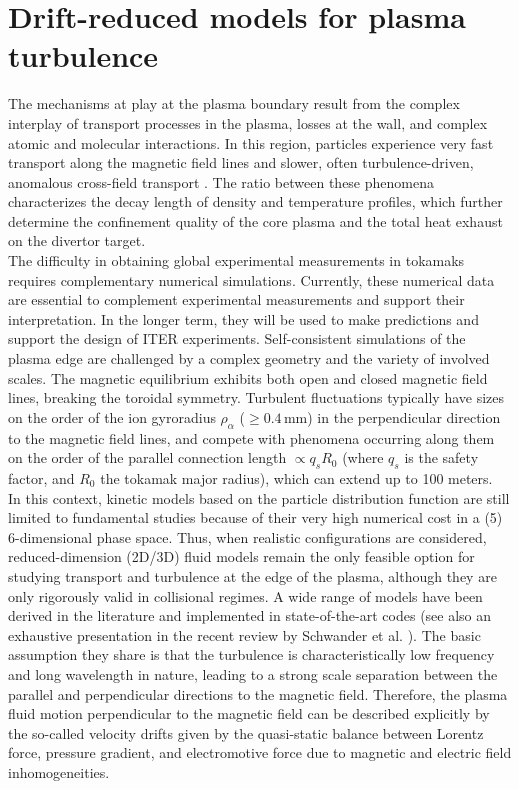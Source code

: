 \chapter{Drift-reduced models for plasma turbulence}
\label{chap:ModellingEdgePlasmaTurbulence}

The mechanisms at play at the plasma boundary result from the complex interplay of transport processes in the plasma, losses at the wall, and complex atomic and molecular interactions. In this region, particles experience very fast transport along the magnetic field lines and slower, often turbulence-driven, anomalous cross-field transport \cite{loarte2007}. The ratio between these phenomena characterizes the decay length of density and temperature profiles, which further determine the confinement quality of the core plasma and the total heat exhaust on the divertor target. \\

The difficulty in obtaining global experimental measurements in tokamaks requires complementary numerical simulations. Currently, these numerical data are essential to complement experimental measurements and support their interpretation. In the longer term, they will be used to make predictions and support the design of ITER experiments. Self-consistent simulations of the plasma edge are challenged by a complex geometry and the variety of involved scales. The magnetic equilibrium exhibits both open and closed magnetic field lines, breaking the toroidal symmetry. Turbulent fluctuations typically have sizes on the order of the ion gyroradius $\rho_\alpha$ ($\ge 0.4\, \text{mm}$) \cite{hennequin2004} in the perpendicular direction to the magnetic field lines, and compete with phenomena occurring along them on the order of the parallel connection length $\propto q_s R_0$ (where $q_s$ is the safety factor, and $R_0$ the tokamak major radius), which can extend up to 100 meters. \\


In this context, kinetic models based on the particle distribution function \cite{DifPradalier_2009, Charidakos_2018} are still limited to fundamental studies because of their very high numerical cost in a (5) 6-dimensional phase space. Thus, when realistic configurations are considered, reduced-dimension (2D/3D) fluid models remain the only feasible option for studying transport and turbulence at the edge of the plasma, although they are only rigorously valid in collisional regimes. A wide range of models have been derived in the literature and implemented in state-of-the-art codes \cite{DUDSON_2009, giacomin2022gbs, stegmeir2019} (see also an exhaustive presentation in the recent review by Schwander et al. \cite{SCHWANDER_2024}). The basic assumption they share is that the turbulence is characteristically low frequency and long wavelength in nature, leading to a strong scale separation between the parallel and perpendicular directions to the magnetic field. Therefore, the plasma fluid motion perpendicular to the magnetic field can be described explicitly by the so-called velocity drifts given by the quasi-static balance between Lorentz force, pressure gradient, and electromotive force due to magnetic and electric field inhomogeneities. \\

